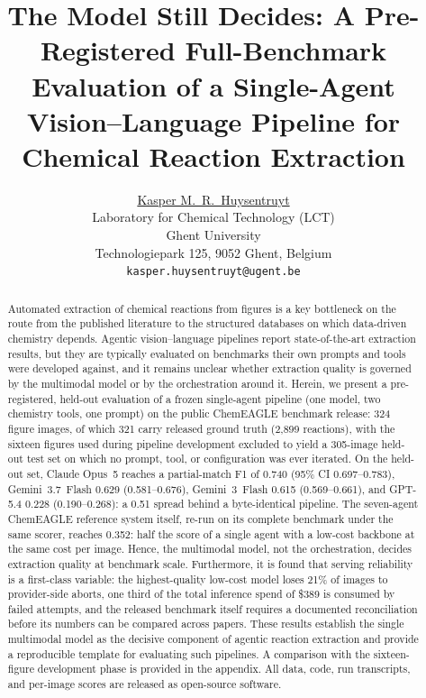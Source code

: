 \documentclass{article}
\title{The Model Still Decides: A Pre-Registered Full-Benchmark Evaluation
of a Single-Agent Vision--Language Pipeline for Chemical Reaction
Extraction}
\author{
  \href{https://orcid.org/0009-0000-0000-0000}{Kasper M.~R.~Huysentruyt}\\
  Laboratory for Chemical Technology (LCT)\\
  Ghent University\\
  Technologiepark 125, 9052 Ghent, Belgium\\
  \texttt{kasper.huysentruyt@ugent.be}\\
}
\begin{document}
\maketitle

\begin{abstract}
Automated extraction of chemical reactions from figures is a key
bottleneck on the route from the published literature to the structured
databases on which data-driven chemistry depends. Agentic
vision--language pipelines report state-of-the-art extraction results,
but they are typically evaluated on benchmarks their own prompts and
tools were developed against, and it remains unclear whether extraction
quality is governed by the multimodal model or by the orchestration
around it. Herein, we present a pre-registered, held-out evaluation of
a frozen single-agent pipeline (one model, two chemistry tools, one
prompt) on the public ChemEAGLE benchmark release: 324 figure images,
of which 321 carry released ground truth (2{,}899 reactions), with the
sixteen figures used during pipeline development excluded to yield a
305-image held-out test set on which no prompt, tool, or configuration
was ever iterated. On the held-out set, Claude
Opus~5 reaches a partial-match F1 of 0.740 (95\% CI 0.697--0.783),
Gemini~3.7~Flash 0.629 (0.581--0.676), Gemini~3~Flash 0.615
(0.569--0.661), and GPT-5.4 0.228 (0.190--0.268): a 0.51 spread behind
a byte-identical pipeline. The seven-agent ChemEAGLE reference system
itself, re-run on its complete benchmark under the same scorer, reaches
0.352: half the score of a single agent with a low-cost backbone at the
same cost per image. Hence, the multimodal model, not the
orchestration, decides extraction quality at benchmark scale. Furthermore, it is
found that serving reliability is a first-class variable: the
highest-quality low-cost model loses 21\% of images to provider-side
aborts, one third of the total inference spend of \$389 is consumed by
failed attempts, and the released benchmark itself requires a
documented reconciliation before its numbers can be compared across
papers. These results establish the single multimodal model as the
decisive component of agentic reaction extraction and provide a
reproducible template for evaluating such pipelines. A comparison with
the sixteen-figure development phase is provided in the appendix. All
data, code, run transcripts, and per-image scores are released as
open-source software.
\end{abstract}

\end{document}
